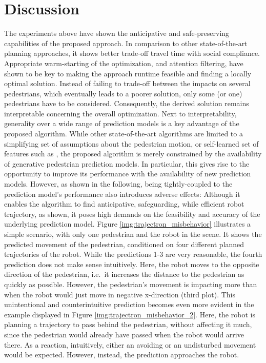 \section{Discussion}
\label{text:experiments/discussion}
The experiments above have shown the anticipative and safe-preserving capabilities of the proposed approach. In comparison to other state-of-the-art planning approaches, it shows better trade-off travel time with social compliance. Appropriate warm-starting of the optimization, and attention filtering, have shown to be key to making the approach runtime feasible and finding a locally optimal solution. Instead of failing to trade-off between the impacts on several pedestrians, which eventually leads to a poorer solution, only some (or one) pedestrians have to be considered. Consequently, the derived solution remains interpretable concerning the overall optimization. Next to interpretability, generality over a wide range of prediction models is a key advantage of the proposed algorithm. While other state-of-the-art algorithms are limited to a simplifying set of assumptions about the pedestrian motion, or self-learned set of features such as \cite{Chen2017}\cite{vandenBerg2011}\cite{Ferrer2013}\cite{Kim2016}, the proposed algorithm is merely constrained by the availability of generative pedestrian prediction models. In particular, this gives rise to the opportunity to improve its performance with the availability of new prediction models. However, as shown in the following, being tightly-coupled to the prediction model's performance also introduces adverse effects:
\newline
Although it enables the algorithm to find anticipative, safeguarding, while efficient robot trajectory, as shown, it poses high demands on the feasibility and accuracy of the underlying prediction model. Figure \ref{img:trajectron_misbehavior} illustrates a simple scenario, with only one pedestrian and the robot in the scene. It shows the predicted movement of the pedestrian, conditioned on four different planned trajectories of the robot. While the predictions 1-3 are very reasonable, the fourth prediction does not make sense intuitively. Here, the robot moves to the opposite direction of the pedestrian, i.e.\, it increases the distance to the pedestrian as quickly as possible. However, the pedestrian's movement is impacting more than when the robot would just move in negative x-direction (third plot). This unintentional and counterintuitive prediction becomes even more evident in the example displayed in Figure \ref{img:trajectron_misbehavior_2}. Here, the robot is planning a trajectory to pass behind the pedestrian, without affecting it much, since the pedestrian would already have passed when the robot would arrive there. As a reaction, intuitively, either an avoiding or an undisturbed movement would be expected. However, instead, the prediction approaches the robot. 

